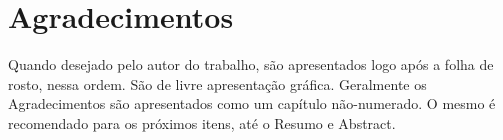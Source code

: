 \chapter*{Agradecimentos}

Quando desejado pelo autor do trabalho, são apresentados logo após a folha de rosto, nessa ordem. São de livre apresentação gráfica. Geralmente os Agradecimentos são apresentados como um capítulo não-numerado. O mesmo é recomendado para os próximos itens, até o Resumo e Abstract.
